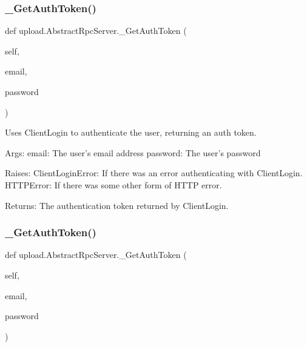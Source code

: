 \subsubsection{\texorpdfstring{\_GetAuthToken()}{\_GetAuthToken()}\hspace{0.1cm}{\footnotesize\ttfamily [1/2]}}
{\footnotesize\ttfamily def upload.\+Abstract\+Rpc\+Server.\+\_\+\+Get\+Auth\+Token (\begin{DoxyParamCaption}\item[{}]{self,  }\item[{}]{email,  }\item[{}]{password }\end{DoxyParamCaption})\hspace{0.3cm}{\ttfamily [private]}}

\begin{DoxyVerb}Uses ClientLogin to authenticate the user, returning an auth token.

Args:
  email:    The user's email address
  password: The user's password

Raises:
  ClientLoginError: If there was an error authenticating with ClientLogin.
  HTTPError: If there was some other form of HTTP error.

Returns:
  The authentication token returned by ClientLogin.
\end{DoxyVerb}
 \mbox{\label{classupload_1_1_abstract_rpc_server_a5a801cc3fdbb8222fa58d41e098f70a7}} 
\subsubsection{\texorpdfstring{\_GetAuthToken()}{\_GetAuthToken()}\hspace{0.1cm}{\footnotesize\ttfamily [2/2]}}
{\footnotesize\ttfamily def upload.\+Abstract\+Rpc\+Server.\+\_\+\+Get\+Auth\+Token (\begin{DoxyParamCaption}\item[{}]{self,  }\item[{}]{email,  }\item[{}]{password }\end{DoxyParamCaption})\hspace{0.3cm}{\ttfamily [private]}}

